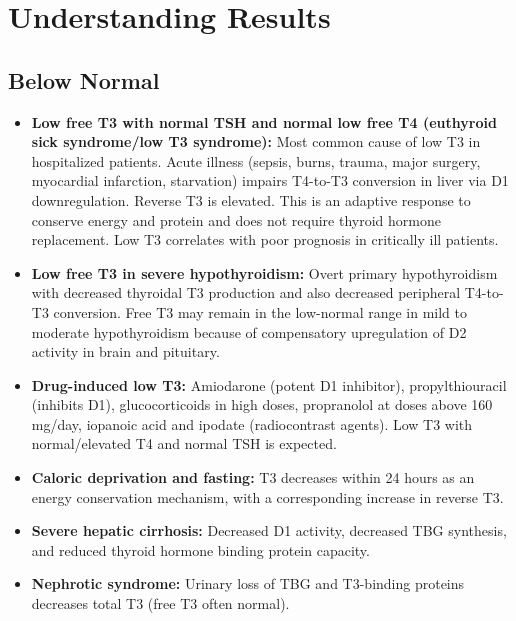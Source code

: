 \section*{Understanding Results}

\subsection*{Below Normal}
\begin{itemize}
  \item \textbf{Low free T3 with normal TSH and normal low free T4 (euthyroid sick syndrome/low T3 syndrome):} Most common cause of low T3 in hospitalized patients. Acute illness (sepsis, burns, trauma, major surgery, myocardial infarction, starvation) impairs T4-to-T3 conversion in liver via D1 downregulation. Reverse T3 is elevated. This is an adaptive response to conserve energy and protein and does not require thyroid hormone replacement. Low T3 correlates with poor prognosis in critically ill patients.
  \item \textbf{Low free T3 in severe hypothyroidism:} Overt primary hypothyroidism with decreased thyroidal T3 production and also decreased peripheral T4-to-T3 conversion. Free T3 may remain in the low-normal range in mild to moderate hypothyroidism because of compensatory upregulation of D2 activity in brain and pituitary.
  \item \textbf{Drug-induced low T3:} Amiodarone (potent D1 inhibitor), propylthiouracil (inhibits D1), glucocorticoids in high doses, propranolol at doses above 160 mg/day, iopanoic acid and ipodate (radiocontrast agents). Low T3 with normal/elevated T4 and normal TSH is expected.
  \item \textbf{Caloric deprivation and fasting:} T3 decreases within 24 hours as an energy conservation mechanism, with a corresponding increase in reverse T3.
  \item \textbf{Severe hepatic cirrhosis:} Decreased D1 activity, decreased TBG synthesis, and reduced thyroid hormone binding protein capacity.
  \item \textbf{Nephrotic syndrome:} Urinary loss of TBG and T3-binding proteins decreases total T3 (free T3 often normal).
\end{itemize}


